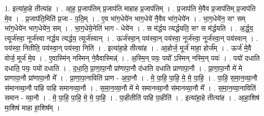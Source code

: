 \documentclass[17pt]{extarticle}
\begin{document}
1. इत्या॑हा॒हे तीत्या॑ह । . आ॒ह॒ प्र॒जाप॑तिम् प्र॒जाप॑ति माहाह प्र॒जाप॑तिम् । . प्र॒जाप॑ति मे॒वैव प्र॒जाप॑तिम् प्र॒जाप॑ति मे॒व । . प्र॒जाप॑ति॒मिति॑ प्र॒जा - प॒ति॒म् । . ए॒व भा॑ग॒धेये॑न भाग॒धेये॑ नै॒वैव भा॑ग॒धेये॑न । . भा॒ग॒धेये॑न॒ सꣳ सम् भा॑ग॒धेये॑न भाग॒धेये॑न॒ सम् । . भा॒ग॒धेये॒नेति॑ भाग - धेये॑न । . स म॑र्द्धय त्यर्द्धयति॒ सꣳ स म॑र्द्धयति । . अ॒र्द्ध॒य॒ त्यूर्ज॑स्वा॒ नूर्ज॑स्वा नर्द्धय त्यर्द्धय॒ त्यूर्ज॑स्वान् । . ऊर्ज॑स्वा॒न् पय॑स्वा॒न् पय॑स्वा॒ नूर्ज॑स्वा॒ नूर्ज॑स्वा॒न् पय॑स्वान् । . पय॑स्वा॒ नितीति॒ पय॑स्वा॒न् पय॑स्वा॒ निति॑ । . इत्या॑हा॒हे तीत्या॑ह । . आ॒होर्ज॒ मूर्ज॑ माहा॒ होर्ज᳚म् । . ऊर्ज॑ मे॒वै वोर्ज॒ मूर्ज॑ मे॒व । . ए॒वास्मि॑न् नस्मिन् ने॒वैवास्मिन्न्॑ । . अ॒स्मि॒न् पयः॒ पयो᳚ ऽस्मिन् नस्मि॒न् पयः॑ । . पयो॑ दधाति दधाति॒ पयः॒ पयो॑ दधाति । . द॒धा॒ति॒ प्रा॒णा॒पा॒नौ प्रा॑णापा॒नौ द॑धाति दधाति प्राणापा॒नौ । . प्रा॒णा॒पा॒नौ मे॑ मे प्राणापा॒नौ प्रा॑णापा॒नौ मे᳚ । . प्रा॒णा॒पा॒नाविति॑ प्राण - अ॒पा॒नौ । . मे॒ पा॒हि॒ पा॒हि॒ मे॒ मे॒ पा॒हि॒ । . पा॒हि॒ स॒मा॒न॒व्या॒नौ स॑मानव्या॒नौ पा॑हि पाहि समानव्या॒नौ । . स॒मा॒न॒व्या॒नौ मे॑ मे समानव्या॒नौ स॑मानव्या॒नौ मे᳚ । . स॒मा॒न॒व्या॒नाविति॑ समान - व्या॒नौ । . मे॒ पा॒हि॒ पा॒हि॒ मे॒ मे॒ पा॒हि॒ । . पा॒हीतीति॑ पाहि पा॒हीति॑ । . इत्या॑हा॒हे तीत्या॑ह । . आ॒हा॒शिष॑ मा॒शिष॑ माहा हा॒शिष᳚म् । \newline
\end{document}
